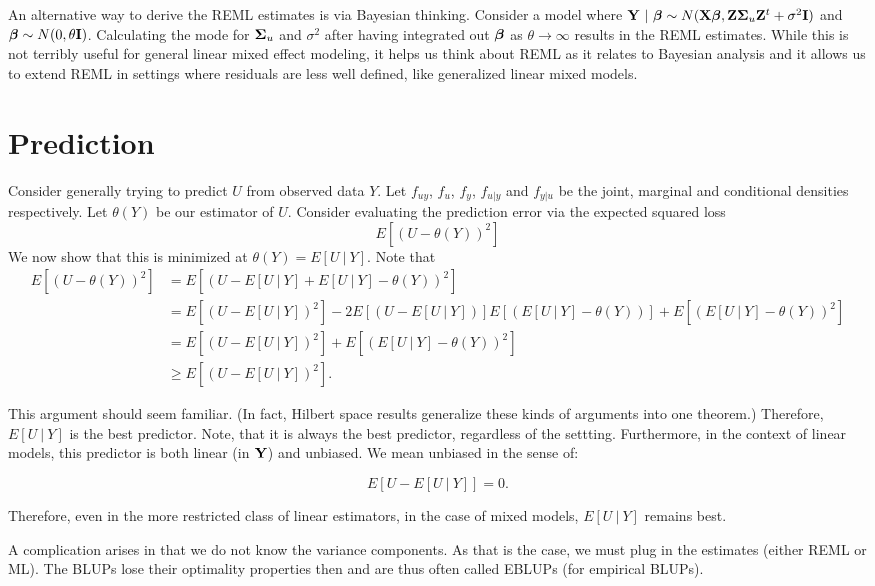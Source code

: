 An alternative way to derive the REML estimates is via Bayesian thinking. Consider a 
model where $\mathbf{Y} ~|~\boldsymbol{\beta} \sim N(\mathbf{X} \boldsymbol{\beta}, \mathbf{Z} \boldsymbol{\Sigma}_u \mathbf{Z}^t +\sigma^2 \mathbf{I})$ 
and $\boldsymbol{\beta} \sim N(0, \theta \mathbf{I})$. Calculating the mode for $\boldsymbol{\Sigma}_u$ and $\sigma^2$
after having integrated out $\boldsymbol{\beta}$ as $\theta \rightarrow \infty$ results in the REML estimates.
While this is not terribly useful for general linear mixed effect modeling, it helps us think
about REML as it relates to Bayesian analysis and it allows us to extend REML in settings
where residuals are less well defined, like generalized linear mixed models.


\section{Prediction}

Consider generally trying to predict $U$ from observed data $Y$. 
Let $f_{uy}$, $f_u$, $f_y$, $f_{u|y}$ and $f_{y|u}$ be the
joint, marginal and conditional densities respectively. Let
$\theta(Y)$ be our estimator of $U$. Consider
evaluating the prediction error via the expected squared loss
$$
E[(U -\theta(Y))^2]
$$
We now show that this is  minimized at $\theta(Y) = E[U ~|~ Y]$. 
Note that
\begin{align}
E[(U -\theta(Y))^2] & = 
E[(U - E[U ~|~ Y] + E[U ~|~ Y] - \theta(Y))^2] \\
& = E[(U - E[U ~|~ Y])^2] - 2 E[(U - E[U~|~Y])]E[(E[U~|~Y] - \theta(Y))] + E[(E[U~|~Y] - \theta(Y))^2] \\
& = E[(U - E[U ~|~ Y])^2] + E[(E[U~|~Y] - \theta(Y))^2] \\
& \geq E[(U - E[U ~|~ Y])^2].
\end{align}

This argument should seem familiar. (In fact, Hilbert space results generalize these
kinds of arguments into one theorem.) Therefore, $E[U~|~Y]$ is the best
predictor. Note, that it is always the best predictor, regardless of the settting.
Furthermore, in the context of linear models, this predictor is both linear (in $\mathbf{Y}$)
and unbiased. We mean unbiased in the sense of:

$$
E[ U - E[U ~|~ Y]] = 0.
$$

Therefore, even in the more restricted class of linear estimators, in the
case of mixed models, $E[U ~|~ Y]$ remains best. 

A complication arises in that we do not know the variance components. As
that is the case, we must plug in the estimates (either REML or ML). 
The BLUPs lose their optimality properties then and are thus often called
EBLUPs (for empirical BLUPs). 

